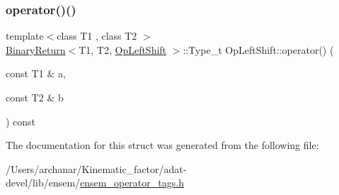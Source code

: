 \subsubsection{\texorpdfstring{operator()()}{operator()()}\hspace{0.1cm}{\footnotesize\ttfamily [3/3]}}
{\footnotesize\ttfamily template$<$class T1 , class T2 $>$ \\
\mbox{\hyperlink{structBinaryReturn}{Binary\+Return}}$<$T1, T2, \mbox{\hyperlink{structOpLeftShift}{Op\+Left\+Shift}} $>$\+::Type\+\_\+t Op\+Left\+Shift\+::operator() (\begin{DoxyParamCaption}\item[{const T1 \&}]{a,  }\item[{const T2 \&}]{b }\end{DoxyParamCaption}) const\hspace{0.3cm}{\ttfamily [inline]}}



The documentation for this struct was generated from the following file\+:\begin{DoxyCompactItemize}
\item 
/\+Users/archanar/\+Kinematic\+\_\+factor/adat-\/devel/lib/ensem/\mbox{\hyperlink{adat-devel_2lib_2ensem_2ensem__operator__tags_8h}{ensem\+\_\+operator\+\_\+tags.\+h}}\end{DoxyCompactItemize}
